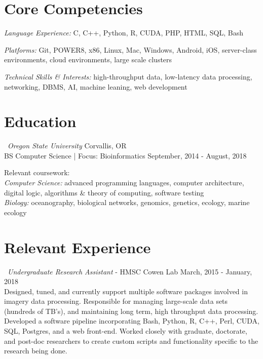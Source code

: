 \documentclass{res}
\begin{document}
 
\begin{resume}


\section{\bf\Large  Core Competencies} 
{\sl Language Experience:} C, C++, Python, R, CUDA, PHP, HTML, SQL, Bash  \hfill

{\sl  Platforms:} Git, POWER8, x86, Linux, Mac, Windows, Android, iOS, server-class environments, cloud environments, large scale clusters

{\sl Technical Skills \& Interests:} high-throughput data, low-latency data processing, networking, DBMS, AI, machine leaning, web development
\mbox{ }

\section{\bf\Large Education} 
\textbullet \ {\sl \large Oregon State University}  \hfill  Corvallis, OR     \\
BS Computer Science | Focus: Bioinformatics  \hfill  September, 2014 - August, 2018

Relevant coursework: \\
{\sl Computer Science:} advanced programming languages, computer architecture, digital logic, algorithms \& theory of computing, software testing \\
{\sl Biology:} oceanography, biological networks, genomics, genetics, ecology, marine ecology
\mbox{ }

\section{\bf\Large Relevant Experience} 
\textbullet \ {\sl Undergraduate Research Assistant} - HMSC Cowen Lab \hfill March, 2015 - January, 2018 \\
Designed, tuned, and currently support multiple software packages involved in imagery data processing. Responsible for managing large-scale data sets (hundreds of TB's), and maintaining long term, high throughput data processing. Developed a software pipeline incorporating Bash, Python, R, C++, Perl, CUDA, SQL, Postgres, and a web front-end. Worked closely with graduate, doctorate, and post-doc researchers to create custom scripts and functionality specific to the research being done.


\end{resume}
\end{document}
